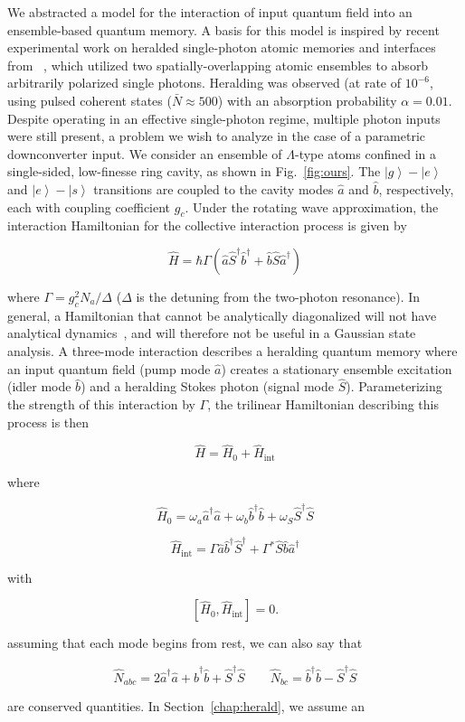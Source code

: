 \documentclass[aps,twocolumn,secnumarabic,amsmath,amssymb,pra,groupedaddress,
showpacs, showkeys]{revtex4-1}
\newcommand{\ket}[1]{\left|#1\right\rangle}
\newcommand{\pna}[1]{\left(#1\right)}
\newcommand{\pnb}[1]{\left[#1\right]}
\newcommand{\eqn}[1]{
\begin{equation}
	#1
\end{equation}
}
\begin{document}
We abstracted a model for the interaction of input quantum field into an
ensemble-based quantum memory. A basis for this model is inspired by recent
experimental work on heralded single-photon atomic memories and interfaces from
\cite{PhysRevLett.98.183601}~\cite{PhysRevLett.103.043601}, which utilized two
spatially-overlapping atomic ensembles to absorb arbitrarily polarized single
photons.  Heralding was observed (at rate of $10^{-6}$, using pulsed coherent
states ($\bar{N}\approx 500$) with an absorption probability
$\alpha=0.01$. Despite operating in an effective single-photon regime, multiple
photon inputs were still present, a problem we wish to analyze in the case of a
parametric downconverter input.  We consider an ensemble of $\Lambda$-type
atoms confined in a single-sided, low-finesse ring cavity, as shown in
Fig.~\ref{fig:ours}. The $\ket{g}-\ket{e}$ and $\ket{e}-\ket{s}$ transitions
are coupled to the cavity modes $\hat{a}$ and $\hat{b}$, respectively, each
with coupling coefficient $g_c$. Under the rotating wave approximation, the
interaction Hamiltonian for the collective interaction process is given by  
\eqn{
\hat{H} = \hbar\Gamma \pna{\hat{a}\hat{S}^{\dagger}\hat{b}^{\dagger} + \hat{b}\hat{S}\hat{a}^{\dagger}}\label{eq:trilinear}
}
where $\Gamma=g_c^2 N_a/\Delta$ ($\Delta$ is the detuning from the two-photon
resonance). In general, a Hamiltonian that cannot be analytically diagonalized
will not have analytical dynamics~\cite{theoretical_qoptics,group_qoptics}, and
will therefore not be useful in a Gaussian state analysis. A three-mode
interaction describes a heralding quantum memory where an input quantum field
(pump mode $\hat{a}$) creates a stationary ensemble excitation (idler mode
$\hat{b}$) and a heralding Stokes photon (signal mode
$\hat{S}$). Parameterizing the strength of this interaction by $\Gamma$, the
trilinear Hamiltonian describing this process is then
\eqn{
\hat{H}=\hat{H}_0+\hat{H}_{\textrm{int}}\label{eq:tri_h_total}
}
where
\eqn{
\hat{H}_0=\omega_a \hat{a}^{\dagger}\hat{a}+\omega_b \hat{b}^{\dagger}\hat{b}+\omega_S \hat{S}^{\dagger}\hat{S}
}
\eqn{
\hat{H}_{\textrm{int}}=\Gamma
\hat{a}\hat{b}^{\dagger}\hat{S}^{\dagger}+\Gamma^*
\hat{S}\hat{b}\hat{a}^{\dagger} \label{eqn:final_tri_ham}
}
with 
\eqn{
\pnb{\hat{H}_0, \hat{H}_{\textrm{int}}}=0. 
}
assuming that each mode begins from rest, we can also say that 
\eqn{
\hat{N}_{abc}= 2\hat{a}^{\dagger}\hat{a}+\hat{b}^{\dagger}\hat{b} +\hat{S}^{\dagger}\hat{S} \qquad \hat{N}_{bc}=\hat{b}^{\dagger}\hat{b}-\hat{S}^{\dagger}\hat{S}
}
are conserved quantities. In Section~\ref{chap:herald}, we assume an
\end{document}
